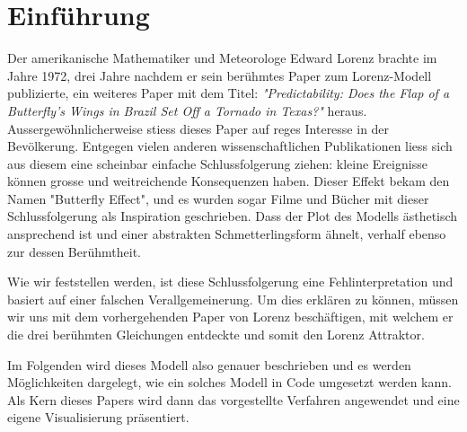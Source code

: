 
\section{Einführung}
Der amerikanische Mathematiker und Meteorologe Edward Lorenz brachte im Jahre 1972, drei Jahre nachdem er sein berühmtes Paper zum Lorenz-Modell publizierte, ein weiteres Paper mit dem Titel: \textit{"Predictability: Does the Flap of a Butterfly’s Wings in Brazil Set Off a Tornado in Texas?"} heraus. Aussergewöhnlicherweise stiess dieses Paper auf reges Interesse in der Bevölkerung. Entgegen vielen anderen wissenschaftlichen Publikationen liess sich aus diesem eine scheinbar einfache Schlussfolgerung ziehen: kleine Ereignisse können grosse und weitreichende Konsequenzen haben. Dieser Effekt bekam den Namen "Butterfly Effect", und es wurden sogar Filme und Bücher mit dieser Schlussfolgerung als Inspiration geschrieben. Dass der Plot des Modells ästhetisch ansprechend ist und einer abstrakten Schmetterlingsform ähnelt, verhalf ebenso zur dessen Berühmtheit. 


Wie wir feststellen werden, ist diese Schlussfolgerung eine Fehlinterpretation und basiert auf einer falschen Verallgemeinerung. Um dies erklären zu können, müssen wir uns mit dem vorhergehenden Paper von Lorenz beschäftigen, mit welchem er die drei berühmten Gleichungen entdeckte und somit den Lorenz Attraktor. 

Im Folgenden wird dieses Modell also genauer beschrieben und es werden Möglichkeiten dargelegt, wie ein solches Modell in Code umgesetzt werden kann. Als Kern dieses Papers wird dann das vorgestellte Verfahren angewendet und eine eigene Visualisierung präsentiert.
